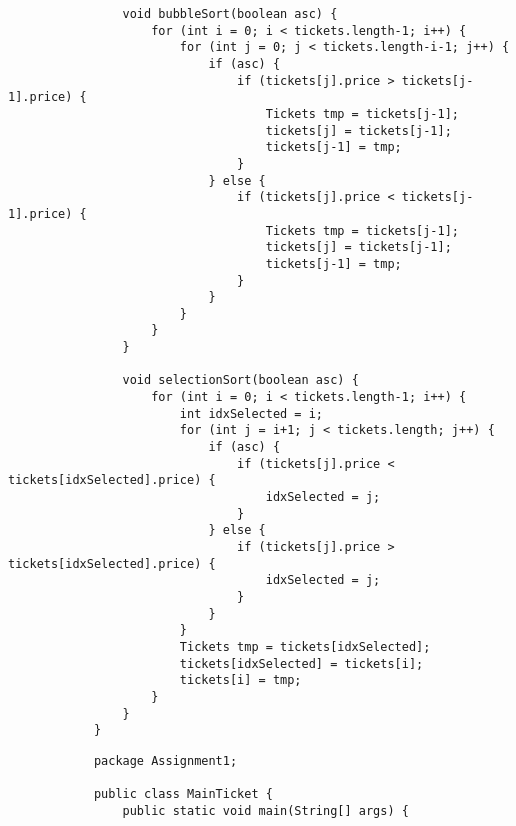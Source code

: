 \documentclass[12pt,titlepage]{article}
\begin{document}
\begin{enumerate}
\begin{enumerate}[label=\arabic*.]
\begin{verbatim}
                void bubbleSort(boolean asc) {
                    for (int i = 0; i < tickets.length-1; i++) {
                        for (int j = 0; j < tickets.length-i-1; j++) {
                            if (asc) {
                                if (tickets[j].price > tickets[j-1].price) {
                                    Tickets tmp = tickets[j-1];
                                    tickets[j] = tickets[j-1];
                                    tickets[j-1] = tmp;
                                }
                            } else {
                                if (tickets[j].price < tickets[j-1].price) {
                                    Tickets tmp = tickets[j-1];
                                    tickets[j] = tickets[j-1];
                                    tickets[j-1] = tmp;
                                }
                            }
                        }
                    }
                }

                void selectionSort(boolean asc) {
                    for (int i = 0; i < tickets.length-1; i++) {
                        int idxSelected = i;
                        for (int j = i+1; j < tickets.length; j++) {
                            if (asc) {
                                if (tickets[j].price < tickets[idxSelected].price) {
                                    idxSelected = j;
                                }
                            } else {
                                if (tickets[j].price > tickets[idxSelected].price) {
                                    idxSelected = j;
                                }
                            }
                        }
                        Tickets tmp = tickets[idxSelected];
                        tickets[idxSelected] = tickets[i];
                        tickets[i] = tmp;
                    }
                }
            }
        \end{verbatim}
        \begin{verbatim}
            package Assignment1;

            public class MainTicket {
                public static void main(String[] args) {
                    

\end{verbatim}
\end{enumerate}
\end{enumerate}
\end{document}
